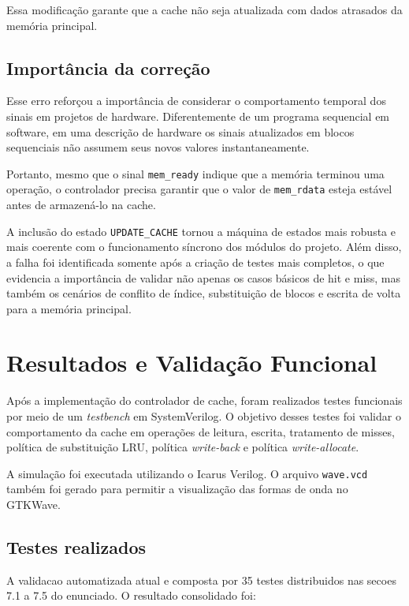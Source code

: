 ﻿\documentclass[12pt,a4paper]{article}
\begin{document}
Essa modificação garante que a cache não seja atualizada com dados atrasados da memória principal.

\subsection{Importância da correção}

Esse erro reforçou a importância de considerar o comportamento temporal dos sinais em projetos de hardware. Diferentemente de um programa sequencial em software, em uma descrição de hardware os sinais atualizados em blocos sequenciais não assumem seus novos valores instantaneamente.

Portanto, mesmo que o sinal \texttt{mem\_ready} indique que a memória terminou uma operação, o controlador precisa garantir que o valor de \texttt{mem\_rdata} esteja estável antes de armazená-lo na cache.

A inclusão do estado \texttt{UPDATE\_CACHE} tornou a máquina de estados mais robusta e mais coerente com o funcionamento síncrono dos módulos do projeto. Além disso, a falha foi identificada somente após a criação de testes mais completos, o que evidencia a importância de validar não apenas os casos básicos de hit e miss, mas também os cenários de conflito de índice, substituição de blocos e escrita de volta para a memória principal.

\section{Resultados e Validação Funcional}

Após a implementação do controlador de cache, foram realizados testes funcionais por meio de um \textit{testbench} em SystemVerilog. O objetivo desses testes foi validar o comportamento da cache em operações de leitura, escrita, tratamento de misses, política de substituição LRU, política \textit{write-back} e política \textit{write-allocate}.

A simulação foi executada utilizando o Icarus Verilog. O arquivo \texttt{wave.vcd} também foi gerado para permitir a visualização das formas de onda no GTKWave.

\subsection{Testes realizados}

A validacao automatizada atual e composta por 35 testes distribuidos nas secoes 7.1 a 7.5 do enunciado. O resultado consolidado foi:
\end{document}
